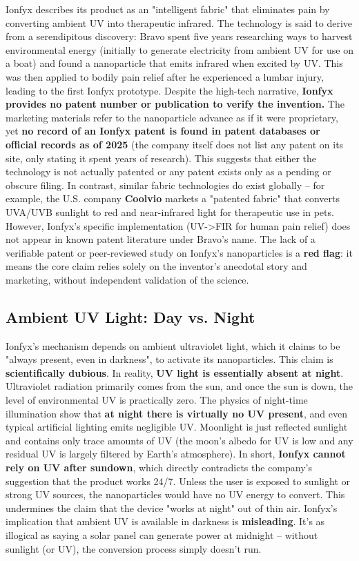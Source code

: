 \documentclass{article}
\begin{document}
Ionfyx describes its product as an "intelligent fabric" that eliminates pain by converting ambient UV into therapeutic infrared. The technology is said to derive from a serendipitous discovery: Bravo spent five years researching ways to harvest environmental energy (initially to generate electricity from ambient UV for use on a boat) and found a nanoparticle that emits infrared when excited by UV. This was then applied to bodily pain relief after he experienced a lumbar injury, leading to the first Ionfyx prototype. Despite the high-tech narrative, \textbf{Ionfyx provides no patent number or publication to verify the invention.} The marketing materials refer to the nanoparticle advance as if it were proprietary, yet \textbf{no record of an Ionfyx patent is found in patent databases or official records as of 2025} (the company itself does not list any patent on its site, only stating it spent years of research). This suggests that either the technology is not actually patented or any patent exists only as a pending or obscure filing. In contrast, similar fabric technologies do exist globally – for example, the U.S. company \textbf{Coolvio} markets a "patented fabric" that converts UVA/UVB sunlight to red and near-infrared light for therapeutic use in pets. However, Ionfyx's specific implementation (UV->FIR for human pain relief) does not appear in known patent literature under Bravo's name. The lack of a verifiable patent or peer-reviewed study on Ionfyx's nanoparticles is a \textbf{red flag}: it means the core claim relies solely on the inventor's anecdotal story and marketing, without independent validation of the science.

\subsection{Ambient UV Light: Day vs. Night}

Ionfyx's mechanism depends on ambient ultraviolet light, which it claims to be "always present, even in darkness", to activate its nanoparticles. This claim is \textbf{scientifically dubious}. In reality, \textbf{UV light is essentially absent at night}. Ultraviolet radiation primarily comes from the sun, and once the sun is down, the level of environmental UV is practically zero. The physics of night-time illumination show that \textbf{at night there is virtually no UV present}, and even typical artificial lighting emits negligible UV. Moonlight is just reflected sunlight and contains only trace amounts of UV (the moon's albedo for UV is low and any residual UV is largely filtered by Earth's atmosphere). In short, \textbf{Ionfyx cannot rely on UV after sundown}, which directly contradicts the company's suggestion that the product works 24/7. Unless the user is exposed to sunlight or strong UV sources, the nanoparticles would have no UV energy to convert. This undermines the claim that the device "works at night" out of thin air. Ionfyx's implication that ambient UV is available in darkness is \textbf{misleading}. It's as illogical as saying a solar panel can generate power at midnight – without sunlight (or UV), the conversion process simply doesn't run.
\end{document}

